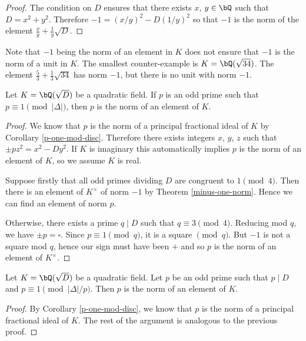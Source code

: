 \begin{proof}
The condition on $D$ ensures that there exists $x$, $y \in \bQ$ such that $D = x^2 + y^2$. Therefore $-1 = (x / y)^2 - D(1/ y)^2$ so that $-1$ is the norm of the element $\frac{x}{y} + \frac{1}{y} \sqrt{D}$.
\end{proof}

Note that $-1$ being the norm of an element in $K$ does not ensure that $-1$ is the norm of a unit in $K$. The smallest counter-example is $K = \bQ(\sqrt{34})$. The element $\frac{5}{3} + \frac{1}{3}\sqrt{34}$ has norm $-1$, but there is no unit with norm $-1$. 

\begin{thm}\label{p-norm-elem-1}
    Let $K = \bQ(\sqrt{D})$ be a quadratic field.  If $p$ is an odd prime such that $p \equiv 1 \pmod {|\Delta|}$, then $p$ is the norm of an element of $K$. 
\end{thm}

\begin{proof}
    We know that $p$ is the norm of a principal fractional ideal of $K$ by Corollary \ref{p-one-mod-disc}. 
    Therefore there exists integers $x$, $y$, $z$ such that $\pm p z^2 = x^2 - Dy^2$. If $K$ is imaginary this automatically implies $p$ is the norm of an element of $K$, so we assume $K$ is real.
    
    Suppose firstly that all odd primes dividing $D$ are congruent to $1 \pmod 4$. Then there is an element of $K^{\times}$ of norm $-1$ by Theorem \ref{minus-one-norm}. Hence we can find an element of norm $p$.

    Otherwise, there exists a prime $q \mid D$ such that $q \equiv 3 \pmod 4$. Reducing mod $q$, we have
    $ \pm p = \square$. Since $p \equiv 1 \pmod q$, it is a square $\pmod q$. But $-1$ is not a square mod $q$, hence our sign must have been $+$ and so $p$ is the norm of an element of $K^{\times}$.
\end{proof}


\begin{thm}\label{p-norm-elem-2}
    Let $K = \bQ(\sqrt{D})$ be a quadratic field. Let $p$ be an odd prime such that $p \mid D$ and $p \equiv 1 \pmod {|\Delta| / p}$. Then $p$ is the norm of an element of $K$. 
\end{thm}

\begin{proof}
    By Corollary \ref{p-one-mod-disc}, we know that $p$ is the norm of a principal fractional ideal of $K$. The rest of the argument is analogous to the previous proof.
\end{proof}  

